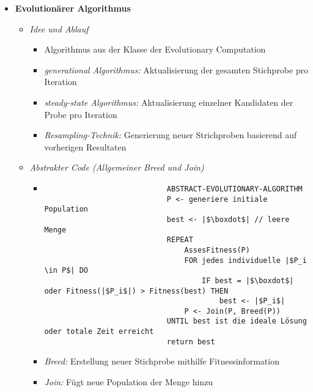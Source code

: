 \begin{itemize}
        \item \textbf{Evolutionärer Algorithmus}
            \begin{itemize}
                \item \textit{Idee und Ablauf}
                    \begin{itemize}
                        \item Algorithmus aus der Klasse der Evolutionary Computation
                        \item \textit{generational Algorithmus:} Aktualisierung der gesamten Stichprobe pro Iteration
                        \item \textit{steady-state Algorithmus:} Aktualisierung einzelner Kandidaten der Probe pro Iteration
                        \item \textit{Resampling-Technik:} Generierung neuer Strichproben basierend auf vorherigen Resultaten
                    \end{itemize}

                \item \textit{Abstrakter Code (Allgemeiner Breed und Join)}
                    \begin{itemize}
                        \item[] 
                            \begin{verbatim}
                            ABSTRACT-EVOLUTIONARY-ALGORITHM
                            P <- generiere initiale Population
                            best <- |$\boxdot$| // leere Menge
                            REPEAT
                                AssesFitness(P)
                                FOR jedes individuelle |$P_i \in P$| DO
                                    IF best = |$\boxdot$| oder Fitness(|$P_i$|) > Fitness(best) THEN
                                        best <- |$P_i$|
                                P <- Join(P, Breed(P))
                            UNTIL best ist die ideale Lösung oder totale Zeit erreicht
                            return best
                            \end{verbatim}
                        \item \textit{Breed:} Erstellung neuer Stichprobe mithilfe Fitnessinformation
                        \item \textit{Join:} Fügt neue Population der Menge hinzu
                    \end{itemize}


\end{itemize}
\end{itemize}
